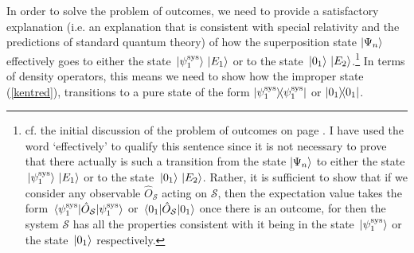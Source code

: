 In order to solve the problem of outcomes, we need to provide a satisfactory explanation (i.e. an explanation that is consistent with special relativity and the predictions of standard quantum theory)  of how the superposition state $\ket{\Psi_n}$ effectively goes to either the state $\ket*{\psi_1^\text{sys}}\ket*{E_1}$ or to the state $\ket*{0_1}\ket*{E_2}$.\footnote{cf. the initial discussion of the problem of outcomes on page \pageref{proboutcomes}. I have used the word `effectively' to qualify this sentence since it is not necessary to prove that there actually is such a transition from the state  $\ket{\Psi_n}$ to either the state $\ket*{\psi_1^\text{sys}}\ket*{E_1}$ or to the state $\ket*{0_1}\ket*{E_2}$. Rather, it is sufficient to show that if we consider any observable $\hat{O}_{\mathcal{S}}$ acting on $\mathcal{S}$, then the expectation value takes the form $\ev*{\hat{O}_{\mathcal{S}}}{\psi_1^\text{sys}}$ or $\ev*{\hat{O}_{\mathcal{S}}}{0_1}$ once there is an outcome, for then the system $\mathcal{S}$ has all the properties consistent with it being in the state $\ket*{\psi_1^\text{sys}}$ or the state $\ket*{0_1}$ respectively.} In terms of density operators, this means we need to show how the improper state (\ref{kentred}), transitions to a pure state of the form $\dyad{\psi_1^\text{sys}}$ or $\dyad{0_1}$.  

